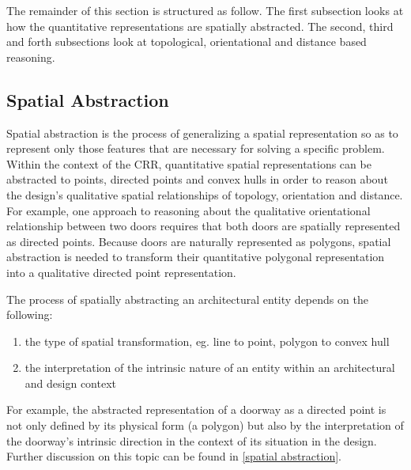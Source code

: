 \documentclass[12pt]{ucthesis}
\begin{document}
The remainder of this section is structured as follow. The first subsection looks at how the quantitative representations are spatially abstracted. The second, third and forth subsections look at topological, orientational and distance based reasoning.

\subsection{Spatial Abstraction}
Spatial abstraction is the process of generalizing a spatial representation so as to represent only those features that are necessary for solving a specific problem. Within the context of the CRR, quantitative spatial representations can be abstracted to points, directed points and convex hulls in order to reason about the design's qualitative spatial relationships of topology, orientation and distance. For example, one approach to reasoning about the qualitative orientational relationship between two doors requires that both doors are spatially represented as directed points. Because doors are naturally represented as polygons, spatial abstraction is needed to transform their quantitative polygonal representation into a qualitative directed point representation.



The process of spatially abstracting an architectural entity depends on the following:
\begin{enumerate} \label{abs dependencies}
\item the type of spatial transformation, eg. line to point, polygon to convex hull
\item the interpretation of the intrinsic nature of an entity within an architectural and design context
\end{enumerate}
For example, the abstracted representation of a doorway as a directed point is not only defined by its physical form (a polygon) but also by the interpretation of the doorway's intrinsic direction in the context of its situation in the design. Further discussion on this topic can be found in \ref{spatial abstraction}.
\end{document}
